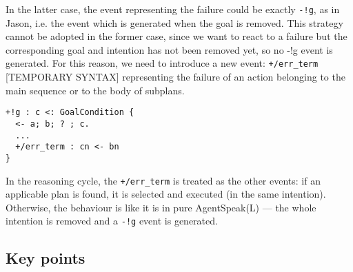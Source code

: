 \noindent In the latter case, the event representing the failure could
be exactly \texttt{-!g}, as in Jason, i.e. the event which is
generated when the goal is removed.
%
This strategy cannot be adopted in the former case, since we want to
react to a failure but the corresponding goal and intention has not
been removed yet, so no -!g event is generated. For this reason, we
need to introduce a new event: \texttt{+/err\_term} [TEMPORARY SYNTAX]
representing the failure of an action belonging to the main sequence
or to the body of subplans.

{\small
\begin{verbatim}
+!g : c <: GoalCondition {
  <- a; b; ? ; c. 
  ...
  +/err_term : cn <- bn
}
\end{verbatim}}

  \noindent In the reasoning cycle, the \texttt{+/err\_term} is
  treated as the other events: if an applicable plan is found, it is
  selected and executed (in the same intention).
%
  Otherwise, the behaviour is like it is in pure AgentSpeak(L) --- the
  whole intention is removed and a \texttt{-!g} event is generated.

%
%
\subsection{Key points}

